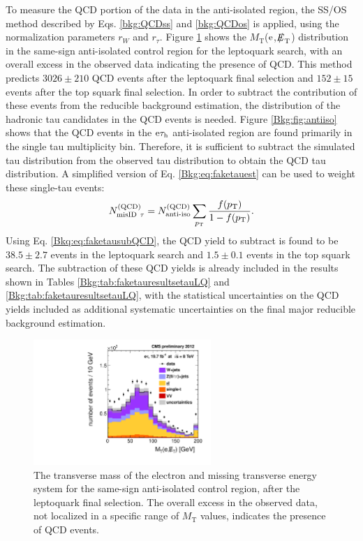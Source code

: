 \documentclass[12pt]{thesis}  %
\newcommand{\tauh}{\ensuremath{\tau_{\text{h}}}\xspace}
\newcommand{\Pe}{\ensuremath{\cmsSymbolFace{e}}\xspace}
\newcommand{\etau}{\ensuremath{\Pe\tauh}\xspace}
\def\eslash{\ensuremath{{\hbox{$E$\kern-0.6em\lower-.05ex\hbox{/}\kern0.10em}}}}
\def\met{\mbox{$\eslash_\text{T}$}\xspace} %
\newcommand{\MT}{\ensuremath{{M}_{\text{T}}}\xspace}%
\begin{document}
To measure the QCD portion of the data in the anti-isolated region, the SS/OS method described by Eqs. \eqref{bkg:QCDss} and \eqref{bkg:QCDos} is applied, using the normalization parameters $r_{W}$ and $r_{\tau}$. Figure \ref{fig:QCDSSAiso} shows the \MT(\Pe,\met) distribution in the same-sign anti-isolated control region for the leptoquark search, with an overall excess in the observed data indicating the presence of QCD. This method predicts $3026\pm210$ QCD events after the leptoquark final selection and $152\pm15$ events after the top squark final selection. In order to subtract the contribution of these events from the reducible background estimation, the \pt distribution of the hadronic tau candidates in the QCD events is needed. Figure \ref{Bkg:fig:antiiso} shows that the QCD events in the \etau anti-isolated region are found primarily in the single tau multiplicity bin. Therefore, it is sufficient to subtract the simulated tau \pt distribution from the observed tau \pt distribution to obtain the QCD tau \pt distribution. A simplified version of Eq. \eqref{Bkg:eq:faketauest} can be used to weight these single-tau events:
\begin{equation}
N_{\text{misID}~\tau}^{\text{(QCD)}} = N_{\text{anti-iso}}^{\text{(QCD)}} \sum_{p_{\mathrm{T}}}{\frac{f(p_{\mathrm{T}})}{1-f(p_{\mathrm{T}})}}. \label{Bkq:eq:faketausubQCD}
\end{equation}
Using Eq. \eqref{Bkq:eq:faketausubQCD}, the QCD yield to subtract is found to be $38.5\pm2.7$ events in the leptoquark search and $1.5\pm0.1$ events in the top squark search. The subtraction of these QCD yields is already included in the results shown in Tables \ref{Bkg:tab:faketauresultsetauLQ} and \ref{Bkg:tab:faketauresultsetauLQ}, with the statistical uncertainties on the QCD yields included as additional systematic uncertainties on the final major reducible background estimation.

\begin{figure}[hbt]
  \begin{center}
    \includegraphics[width=0.6\textwidth]{figures/etau/eMETTMassSSAIsoFinal.pdf}
    \caption{The transverse mass of the electron and missing transverse energy system for the same-sign anti-isolated control region, after the leptoquark final selection. The overall excess in the observed data, not localized in a specific range of \MT values, indicates the presence of QCD events.}
    \label{fig:QCDSSAiso}
  \end{center}
\end{figure}
\end{document}
